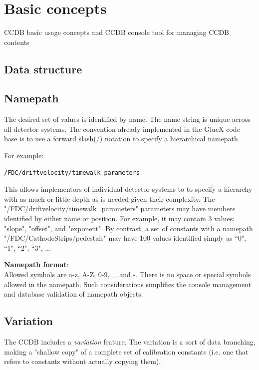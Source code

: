 \documentclass{article}
\begin{document}
\newpage
\section{Basic concepts}\label{sec:basic_concepts}

CCDB basic usage concepts and CCDB console tool for managing CCDB contents


\subsection{Data structure}


\subsection{Namepath}
The desired set of values is identified by name. The name string is unique
across all detector systems. The convention already implemented in the GlueX
code base is to use a forward slash(/) notation to specify a hierarchical
namepath.

For example:
\begin{verbatim}
/FDC/driftvelocity/timewalk_parameters
\end{verbatim}

This allows implementors of individual detector systems to to specify a
hierarchy with as much or little depth as is needed given their complexity.
The "/FDC/driftvelocity/timewalk\_parameters" parameters may have members
identified by either name or position. For example, it may contain 3 values:
"slope", "offset", and "exponent". By contrast, a set of constants with a
namepath "/FDC/CathodeStrips/pedestals" may have 100 values identified simply
as ``0", ``1", ``2", ``3", ...

\textbf{Namepath format}:\\
Allowed symbols are a-z, A-Z, 0-9, \_ and -. There is no space or special symbols
allowed in the namepath. Such considerations simplifies the console management
and database validation of namepath objects.


\subsection{Variation}
The CCDB includes a \textit{variation} feature. The variation is a sort
of data branching, making a "shallow copy" of a complete set of calibration
constants (i.e. one that refers to constants without actually copying them).
\end{document}

